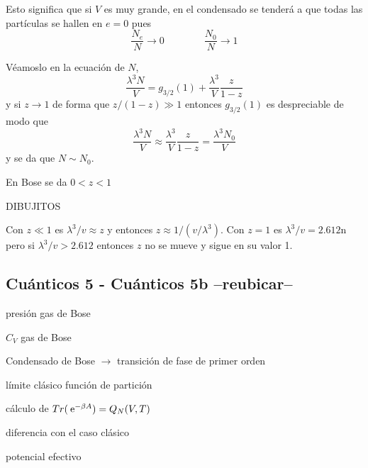 \documentclass[10pt,oneside]{CBFT_book}
\begin{document}
Esto significa que si $V$ es muy grande, en el condensado se tenderá a que todas las partículas se hallen en
$ e = 0 $ pues 
\[
	\frac{N_e}{N} \to 0 \qquad \qquad \frac{N_0}{N} \to 1
\]

Véamoslo en la ecuación de $N$,
\[
	\frac{\lambda^3 N}{V} = g_{3/2}(1) + \frac{\lambda^3}{V} \frac{z}{1-z}
\]
y si $z \to 1$ de forma que $z/(1-z) \gg 1$ entonces $g_{3/2}(1)$ es despreciable de modo que
\[
	\frac{\lambda^3 N}{V} \approx \frac{\lambda^3}{V} \frac{z}{1-z} = \frac{\lambda^3 N_0}{V} 
\]
y se da que $ N \sim N_0 $.

En Bose se da $ 0 < z < 1$

DIBUJITOS

Con $ z \ll 1$ es $ \lambda^3 / v \approx z $ y entonces $ z \approx 1/ (v/\lambda^3) $.
Con $ z=1 $ es $ \lambda^3 / v = 2.612$n pero si $ \lambda^3 / v > 2.612 $ entonces $z$ no se mueve y
sigue en su valor 1.


\subsection{Cuánticos 5 - Cuánticos 5b --reubicar--}

presión gas de Bose

$C_V$ gas de Bose

Condensado de Bose $\to$ transición de fase de primer orden

límite clásico función de partición

cálculo de $ Tr (\:\mathrm{e}^{-\beta A} ) = Q_N(V,T) $

diferencia con el caso clásico

potencial efectivo



\end{document}
